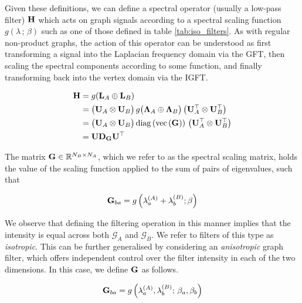 Given these definitions, we can define a spectral operator (usually a low-pass filter) $\mathbf{H}$ which acts on graph signals according to a spectral scaling function $g(\lambda \,; \, \beta)$ such as one of those defined in table \ref{tab:iso_filters}. As with regular non-product graphs, the action of this operator can be understood as first transforming a signal into the Laplacian frequency domain via the GFT, then scaling the spectral components according to some function, and finally transforming back into the vertex domain via the IGFT.

\begin{align}
    \label{eq:graph_filter}
    \mathbf{H} & = g(\mathbf{L}_A \oplus \mathbf{L}_B) \notag                                                                                          \\
        & = \big( \mathbf{U}_A \otimes \mathbf{U}_B \big) \, g \big( \mathbf{\Lambda}_A \oplus \mathbf{\Lambda}_B \big) \, \big( \mathbf{U}_A^\top \otimes \mathbf{U}_B^\top \big) \notag \\
        & = \big( \mathbf{U}_A \otimes \mathbf{U}_B \big) \, \text{\textup{diag}}\left(\text{\textup{vec}}\left(\mathbf{G}\right)\right) \, \big( \mathbf{U}_A^\top \otimes \mathbf{U}_B^\top \big) \notag \\
        &= \mathbf{U} \mathbf{D}_{\mathbf{G}} \mathbf{U}^\top
\end{align}


The matrix $\mathbf{G} \in \mathbb{R}^{N_B \times N_A}$, which we refer to as the spectral scaling matrix, holds the value of the scaling function applied to the sum of
pairs of eigenvalues, such that

\begin{equation}
    \label{eq:Gba}
    \mathbf{G}_{ba} = g\left(\lambda^{(A)}_a + \lambda^{(B)}_b; \beta\right)
\end{equation}



We observe that defining the filtering operation in this manner implies that the intensity is equal across both $\mathcal{G}_A$ and $\mathcal{G}_B$. We refer to filters of this type as \textit{isotropic}. This can be further generalised by considering an \textit{anisotropic} graph filter, which offers independent control over the filter intensity in each of the two dimensions. In this case, we define $\mathbf{G}$ as follows.

\begin{equation}
    \label{eq:Gba2}
    \mathbf{G}_{ba} =  g \left(\lambda^{(A)}_a, \lambda^{(B)}_b; \, \beta_a, \beta_b\right)
\end{equation}


